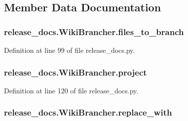\subsection{Member Data Documentation}
\subsubsection[{\texorpdfstring{files\+\_\+to\+\_\+branch}{files_to_branch}}]{\setlength{\rightskip}{0pt plus 5cm}release\+\_\+docs.\+Wiki\+Brancher.\+files\+\_\+to\+\_\+branch}\hypertarget{classrelease__docs_1_1_wiki_brancher_a938c78ba6e8adfb6af039dd500ac6466}{}\label{classrelease__docs_1_1_wiki_brancher_a938c78ba6e8adfb6af039dd500ac6466}


Definition at line 99 of file release\+\_\+docs.\+py.

\subsubsection[{\texorpdfstring{project}{project}}]{\setlength{\rightskip}{0pt plus 5cm}release\+\_\+docs.\+Wiki\+Brancher.\+project}\hypertarget{classrelease__docs_1_1_wiki_brancher_a4ac9c796f95690cca04049b557055443}{}\label{classrelease__docs_1_1_wiki_brancher_a4ac9c796f95690cca04049b557055443}


Definition at line 120 of file release\+\_\+docs.\+py.

\subsubsection[{\texorpdfstring{replace\+\_\+with}{replace_with}}]{\setlength{\rightskip}{0pt plus 5cm}release\+\_\+docs.\+Wiki\+Brancher.\+replace\+\_\+with}\hypertarget{classrelease__docs_1_1_wiki_brancher_aa33d991e629cc94fbfefe4f8569e283e}{}\label{classrelease__docs_1_1_wiki_brancher_aa33d991e629cc94fbfefe4f8569e283e}


